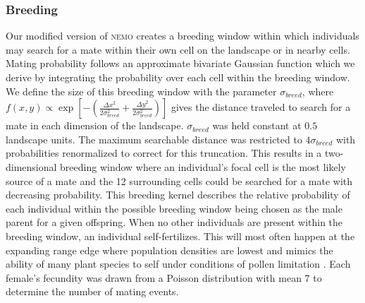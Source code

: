 \subsubsection{Breeding}
Our modified version of \textsc{nemo} creates a breeding window within which individuals may search for a mate within their own cell on the landscape or in nearby cells. Mating probability follows an approximate bivariate Gaussian function which we derive by integrating the probability over each cell within the breeding window. We define the size of this breeding window with the parameter $\sigma_{breed}$, where $f(x,y) \propto \exp{[-(\frac{\Delta x^2}{2\sigma_{breed}^2}+\frac{\Delta y^2}{2\sigma_{breed}^2})]}$ gives the distance traveled to search for a mate in each dimension of the landscape. $\sigma_{breed}$ was held constant at $0.5$ landscape units. The maximum searchable distance was restricted to $4\sigma_{breed}$ with probabilities renormalized to correct for this truncation. This results in a two-dimensional breeding window where an individual's focal cell is the most likely source of a mate and the 12 surrounding cells could be searched for a mate with decreasing probability. This breeding kernel describes the relative probability of each individual within the possible breeding window being chosen as the male parent for a given offspring. When no other individuals are present within the breeding window, an individual self-fertilizes. This will most often happen at the expanding range edge where population densities are lowest and mimics the ability of many plant species to self under conditions of pollen limitation \citep{Hargreaves:2014}. Each female's fecundity was drawn from a Poisson distribution with mean 7 to determine the number of mating events. 

